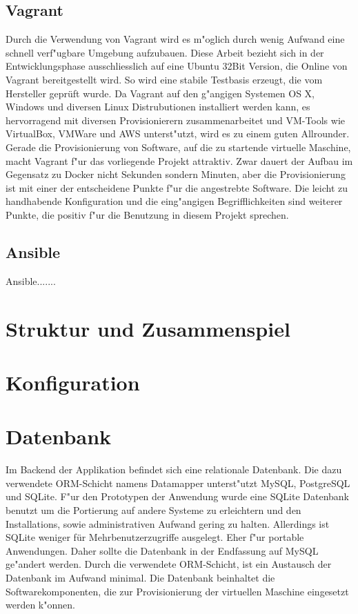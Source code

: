 \subsection{Vagrant}
Durch die Verwendung von Vagrant wird es m"oglich durch wenig Aufwand eine schnell verf"ugbare Umgebung aufzubauen.
Diese Arbeit bezieht sich in der Entwicklungsphase ausschliesslich auf eine Ubuntu 32Bit Version, die Online von Vagrant bereitgestellt wird.
So wird eine stabile Testbasis erzeugt, die vom Hersteller geprüft wurde.\newline
Da Vagrant auf den g"angigen Systemen OS X, Windows und diversen Linux Distrubutionen installiert werden kann, es hervorragend mit diversen Provisionierern zusammenarbeitet und VM-Tools wie VirtualBox, VMWare und AWS unterst"utzt, wird es zu einem guten Allrounder. \newline
Gerade die Provisionierung von Software, auf die zu startende virtuelle Maschine, macht Vagrant f"ur das vorliegende Projekt attraktiv.
Zwar dauert der Aufbau im Gegensatz zu Docker nicht Sekunden sondern Minuten, aber die Provisionierung ist mit einer der entscheidene Punkte f"ur die angestrebte Software.\newline
Die leicht zu handhabende Konfiguration und die eing"angigen Begrifflichkeiten sind weiterer Punkte, die positiv f"ur die Benutzung in diesem Projekt sprechen.


\subsection{Ansible}
 Ansible.......

\section{Struktur und Zusammenspiel}
\section{Konfiguration}
\section{Datenbank}
Im Backend der Applikation befindet sich eine relationale Datenbank. \newline
Die dazu verwendete ORM-Schicht namens Datamapper unterst"utzt MySQL, PostgreSQL und SQLite.\newline
F"ur den Prototypen der Anwendung wurde eine SQLite Datenbank benutzt um die Portierung auf andere Systeme zu erleichtern und den Installations, sowie administrativen Aufwand gering zu halten.\newline
Allerdings ist SQLite weniger für Mehrbenutzerzugriffe ausgelegt. Eher f"ur portable Anwendungen. Daher sollte die Datenbank in der Endfassung auf MySQL ge"andert werden.\newline
Durch die verwendete ORM-Schicht, ist ein Austausch der Datenbank im Aufwand minimal.\newline
Die Datenbank beinhaltet die Softwarekomponenten, die zur Provisionierung der virtuellen Maschine eingesetzt werden k"onnen.


